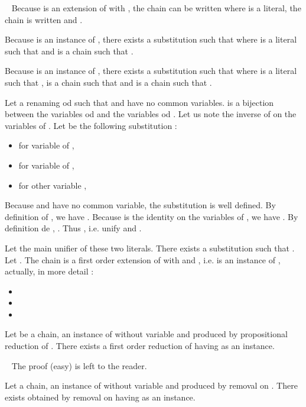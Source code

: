 \documentclass{article}
\newenvironment{preuve}{\noindent {\em Proof :}\ }{{\hfill
    }\vspace{.5pc}} \newcommand{\sg}{\!\!<\!\!}
\begin{document}
\begin{preuve}
Because  is an extension of  with , the chain  can be written  where  is a literal, the chain  is
written  and .

Because  is an instance of , there exists a substitution  such that  where  is a literal such that
 and  is a chain such that .

Because  is an instance of , there exists a substitution  such that  where 
is a literal such that ,  is a chain such that  and  is a  chain
such that .

Let  a renaming od  such that  and  have no common variables.  is a bijection between the variables
od  and the variables od . Let us note  the inverse of  on the variables of .
Let  be the following substitution :
\begin{itemize}
\item for  variable of , 
\item for  variable of , 
\item for other variable , 
\end{itemize}

Because  and  have no common variable, the substitution  is well defined.
By definition of ,  we have . Because  is the identity on the variables of , 
we have . By definition de , .
Thus , i.e.  unify  and . 

Let  the main unifier of these two literals. There exists a substitution  such that .
Let . The chain  is a first order extension of  with  and , i.e.
 is an instance of , actually, in more detail :
\begin{itemize}
\item 
\item 
\item 
\end{itemize}

\end{preuve}

\begin{lemme}\label{lifting-reduction}
Let  be a chain,  an instance of  without variable and  produced by propositional reduction of .
There exists  a first order reduction of  having  as an instance.
\end{lemme}

\begin{preuve}
The proof (easy) is left to the reader.
\end{preuve}

\begin{lemme}\label{lifting-removal}
Let  a chain,  an instance of  without variable and  produced by removal on .
There exists  obtained by removal on  having  as an instance.
\end{lemme}
\end{document}
